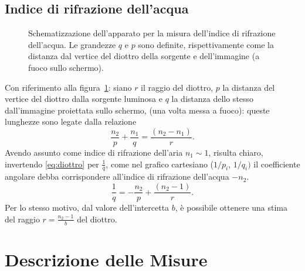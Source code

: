 \documentclass{article}[a4paper,11pt]
\begin{document}
\subsection*{Indice di rifrazione dell'acqua}
\begin{figure}[!htb]\centering
 \caption{Schematizzazione dell'apparato per la misura dell'indice di
    rifrazione dell'acqua. Le grandezze $q$ e $p$ sono definite,
    rispettivamente come la distanza dal vertice del diottro della
    sorgente e dell'immagine (a fuoco sullo schermo).}
\label{fig:acqua}
\end{figure}
\noindent
Con riferimento alla figura~\ref{fig:acqua}: siano $r$ il raggio del diottro, $p$ la distanza del vertice del diottro dalla sorgente luminosa e $q$ la distanza dello stesso dall'immagine proiettata sullo schermo, (una volta messa a fuoco): queste lunghezze sono legate dalla relazione
\begin{equation}\label{eq:diottro}
  \frac{n_2}{p} + \frac{n_1}{q} = \frac{(n_2 - n_1)}{r}.
\end{equation}
\noindent
Avendo assunto come indice di rifrazione dell'aria $n_1 \sim 1$, risulta chiaro, invertendo \eqref{eq:diottro} per $\frac{1}{q}$, come nel grafico cartesiano ($1/p_i$, $1/q_i)$ il coefficiente angolare debba corrispondere all'indice di rifrazione dell'acqua $-n_2$. 
\begin{equation}\label{eq:fit_w}
  \frac{1}{q} = -\frac{n_2}{p} + \frac{(n_2 - 1)}{r}.
\end{equation}
Per lo stesso motivo, dal valore dell'intercetta $b$, è possibile ottenere una stima del raggio $r =\frac{n_2 - 1}{b}$ del diottro.

\section{Descrizione delle Misure}
\end{document}
